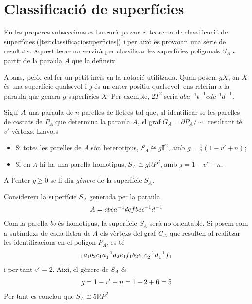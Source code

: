 \documentclass[../main.tex]{subfiles}
\begin{document}
\section{Classificació de superfícies}

En les properes subseccions es buscarà provar el teorema de classificació de superfícies (\ref{ter:classificaciosuperficies}) i per això es provaran una sèrie de resultats. Aquest teorema servirà per classificar les superfícies poligonals $S_A$ a partir de la paraula $A$ que la defineix.

Abans, però, cal fer un petit incís en la notació utilitzada. Quan posem $gX$, on $X$ és una superfície qualsevol i $g$ és un enter positiu qualsevol, ens referim a la paraula que genera $g$ superfícies $X$. Per exemple, $2T^2$ seria $aba^{-1}b^{-1}cdc^{-1}d^{-1}$.

\begin{ter}
\label{ter:classificaciosuperficies} Sigui $A$ una paraula de $n$ parelles de lletres tal que, al identificar-se les parelles de costats de $P_A$ que determina la paraula $A$, el graf $G_A=\partial P_A/\sim$ resultant té $v'$ vèrtexs. Llavors
\begin{itemize}
    \item Si totes les parelles de $A$ són heterotipus, $S_A\cong g\mathbb{T}^2$, amb $g = \frac{1}{2}(1-v'+n)$;
    \item Si en $A$ hi ha una parella homotipus, $S_A\cong g\mathbb{R}P^2$, amb $g=1-v'+n$.
\end{itemize}
A l'enter $g\geq 0$ se li diu \textit{gènere} de la superfície $S_A$.
\end{ter}

\begin{ej}
Considerem la superfície $S_A$ generada per la paraula
\begin{equation}
    \notag
    A=abca^{-1}defbec^{-1}d^{-1}
\end{equation}
Com la parella $bb$ és homotipus, la superfície $S_A$ serà no orientable. Si posem com a subíndexs de cada lletra de $A$ els vèrtexs del graf $G_A$ que resulten al realitzar les identificacions en el polígon $P_A$, es té 
\begin{equation}
    \notag
    _1a_1b_2c_1a^{-1}_1d_2e_1f_1b_2e_1c^{-1}_2d^{-1}_1f_1
\end{equation}
i per tant $v'=2$. Així, el gènere de $S_A$ és 
\begin{equation}
    \notag
    g=1-v'+n=1-2+6=5
\end{equation}
Per tant es conclou que $S_A\cong 5\mathbb{R}P^2$
\end{ej}
\end{document}
